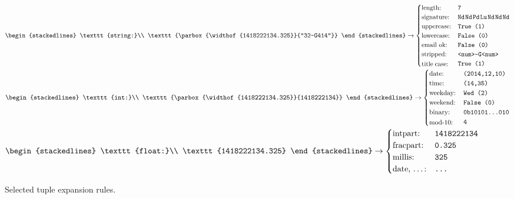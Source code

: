 \begin{figure}[h]
  \newcommand{\largest}{date, \ldots:}
  $\begin{stackedlines}
    \texttt{string:}\\
    \texttt{\parbox{\widthof{1418222134.325}}{"32-G414"}}
  \end{stackedlines} \rightarrow
  \begin{cases}
    \text{length:} & \texttt{7}\\
    \text{signature:} & \sigrule{Nd Nd Pd Lu Nd Nd Nd}\\
    \text{uppercase:} & \texttt{True (1)}\\
    \text{lowercase:} & \texttt{False (0)}\\
    \text{email ok:} & \texttt{False (0)}\\
    \text{stripped:} & \texttt{<num>-G<num>}\\
    \text{\parbox{\widthof{\largest}}{title case:}} & \texttt{True (1)}
  \end{cases}\hfill$
  $\begin{stackedlines}
    \texttt{int:}\\
    \texttt{\parbox{\widthof{1418222134.325}}{1418222134}}
  \end{stackedlines} \rightarrow
  \begin{cases}
    \text{date:} & \texttt{(2014,12,10)}\\
    \text{time:} & \texttt{(14,35)}\\
    \text{weekday:} & \texttt{Wed (2)}\\
    \text{weekend:} & \texttt{False (0)}\\
    \text{binary:} & \texttt{0b10101\ldots010}\\
    \text{\parbox{\widthof{\largest}}{mod-10:}} & \texttt{4}
  \end{cases}\hfill$
   $\begin{stackedlines}
    \texttt{float:}\\
    \texttt{1418222134.325}
  \end{stackedlines} \rightarrow
  \begin{cases}
    \text{intpart:} & \texttt{1418222134}\\
    \text{fracpart:} & \texttt{0.325}\\
    \text{millis:} & \texttt{325}\\
    \text{\parbox{\widthof{\largest}}{date, \ldots:}} & \texttt{\ldots}
  \end{cases}\hfill$

  \caption{Selected tuple expansion rules.}
  \label{fig:tuple-expansion}
\end{figure}

